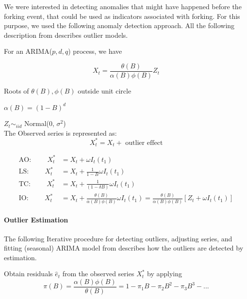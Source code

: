 \documentclass[12pt]{report}
\begin{document}
We were interested in detecting anomalies that might have happened before the forking event, that could be used as indicators associated with forking. For this purpose, we used the following anomaly detection approach. All the following description from \cite{Chen} describes outlier models. 

For an ARIMA($p, d, q$) process, we have 

\begin{equation}
X_t = \frac{\theta(B)}{\alpha(B) \phi(B)} Z_t 
\end{equation}

Roots of $\theta(B), \phi(B)$ outside unit circle

$\alpha(B) = (1 - B)^d$

$Z_t \sim_{iid}$ Normal(0, $\sigma^2$) \\

The Observed series is represented as:
\begin{equation}
X^*_t = X_t + \text{ outlier effect}
\end{equation}

\begin{align}
\text{AO:}\hspace{1cm}X^*_t &= X_t + \omega I_t(t_1) \\
\text{LS:}\hspace{1cm}X^*_t &= X_t + \frac{1}{1 - B} \omega I_t(t_1) \\
\text{TC:}\hspace{1cm}X^*_t &= X_t + \frac{1}{(1 - \delta B)} \omega I_t(t_1) \\
\text{IO:}\hspace{1cm}X^*_t &= X_t + \frac{\theta(B)}{\alpha(B) \phi(B)} \omega I_t(t_1) = \frac{\theta(B)}{\alpha(B) \phi(B)}\left[Z_t + \omega I_t(t_1)\right]
\end{align}

\paragraph{Outlier Estimation} 

The following Iterative procedure for detecting outliers, adjusting series,
and fitting (seasonal) ARIMA model from \cite{Chen} describes how the outliers are detected by estimation. 

Obtain residuals $\hat{e}_t$ from the observed series $X^*_t$ by applying
\begin{equation*}
\pi(B) = \frac{\alpha(B) \phi(B)}{\theta(B)} = 1 - \pi_1B - \pi_2B^2 - \pi_3B^3 - ...
\end{equation*}
\end{document}
